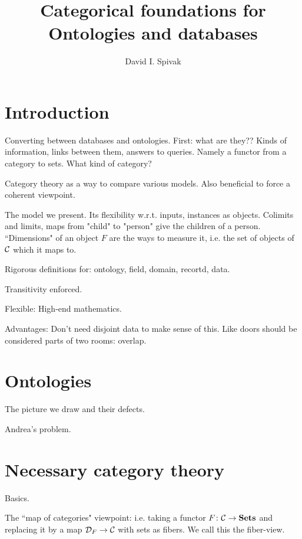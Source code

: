 \documentclass{amsart}
\begin{document}
\title{Categorical foundations for Ontologies and databases}

\author{David I. Spivak}

\maketitle

\tableofcontents

\section{Introduction}

Converting between databases and ontologies.  First: what are they??  Kinds of information, links between them, answers to queries.  Namely a functor from a category to sets.  What kind of category?

Category theory as a way to compare various models.  Also beneficial to force a coherent viewpoint.

The model we present.  Its flexibility w.r.t. inputs, instances as objects.  Colimits and limits, maps from "child" to "person" give the children of a person.  ``Dimensions" of an object $F$ are the ways to measure it, i.e. the set of objects of $\mathcal{C}$ which it maps to.

Rigorous definitions for: ontology, field, domain, recortd, data.

Transitivity enforced.

Flexible: High-end mathematics.

Advantages: Don't need disjoint data to make sense of this.  Like doors should be considered parts of two rooms: overlap.

\section{Ontologies}

The picture we draw and their defects.

Andrea's problem.

\section{Necessary category theory}

Basics.

The ``map of categories" viewpoint: i.e. taking a functor $F\colon\mathcal{C}\rightarrow{\bf Sets}$ and replacing it by a map $\mathcal{D}_F\rightarrow\mathcal{C}$ with sets as fibers.  We call this the fiber-view.
\end{document}
